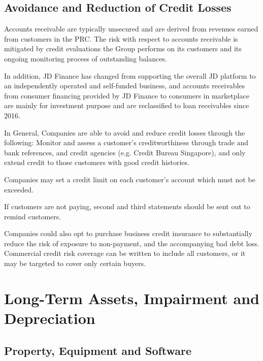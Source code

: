 \subsection{Avoidance and Reduction of Credit Losses} 
Accounts receivable are typically unsecured and are derived from revenues earned from customers in the PRC. The risk with respect to accounts receivable is mitigated by credit evaluations the Group performs on its customers and its ongoing monitoring process of outstanding balances.

In addition, JD Finance has changed from supporting the overall JD platform to an independently operated and self-funded business, and accounts receivables from consumer financing provided by JD Finance to consumers in marketplace are mainly for investment purpose and are reclassified to loan receivables since 2016.

In General, Companies are able to avoid and reduce credit losses through the following: 
Monitor and assess a customer’s creditworthiness through trade and bank references, and credit agencies (e.g. Credit Bureau Singapore), and only extend credit to those customers with good credit histories. 
 
Companies may set a credit limit on each customer’s account which must not be exceeded. 

If customers are not paying, second and third statements should be sent out to remind customers.  
 
Companies could also opt to purchase business credit insurance to substantially reduce the risk of exposure to non-payment, and the accompanying bad debt loss. Commercial credit risk coverage can be written to include all customers, or it may be targeted to cover only certain buyers.

\section{Long-Term Assets, Impairment and Depreciation} 
\subsection{Property, Equipment and Software}

